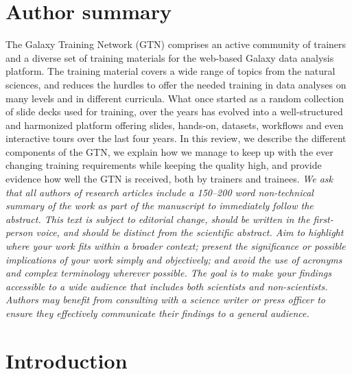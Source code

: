 \documentclass[10pt,letterpaper]{article}
\begin{document}
\section*{Author summary}
The Galaxy Training Network (GTN) comprises an active community of trainers and a diverse set of training materials for the web-based Galaxy data analysis platform. The training material covers a wide range of topics from the natural sciences, and reduces the hurdles to offer the needed training in data analyses on many levels and in different curricula. What once started as a random collection of slide decks used for training, over the years has evolved into a well-structured and harmonized platform offering slides, hands-on, datasets, workflows and even interactive tours over the last four years. 
In this review, we describe the different components of the GTN, we explain how we manage to keep up with the ever changing training requirements while keeping the quality high, and provide evidence how well the GTN is received, both by trainers and trainees. 
\emph{We ask that all authors of research articles include a 150–200 word non-technical summary of the work as part of the manuscript to immediately follow the abstract.
This text is subject to editorial change, should be written in the first-person voice, and should be distinct from the scientific abstract.
Aim to highlight where your work fits within a broader context; present the significance or possible implications of your work simply and objectively; and avoid the use of acronyms and complex terminology wherever possible.
The goal is to make your findings accessible to a wide audience that includes both scientists and non-scientists.
Authors may benefit from consulting with a science writer or press officer to ensure they effectively communicate their findings to a general audience.}



\section*{Introduction}
\end{document}
